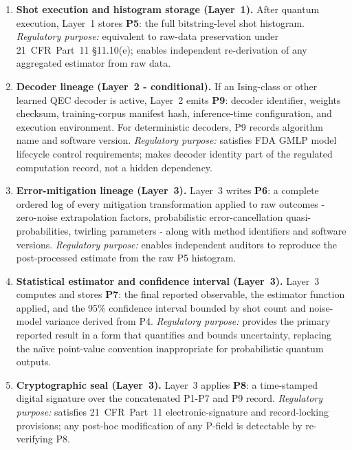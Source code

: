 \documentclass[11pt,letterpaper]{article}
\begin{document}
\begin{enumerate}[leftmargin=2em,itemsep=4pt]
\item \textbf{Shot execution and histogram storage (Layer~1).}\;
After quantum execution, Layer~1 stores \textbf{P5}: the full bitstring-level shot
histogram.
\textit{Regulatory purpose:} equivalent to raw-data preservation under 21~CFR~Part~11
\S{}11.10(e); enables independent re-derivation of any aggregated estimator from raw data.

\item \textbf{Decoder lineage (Layer~2 - conditional).}\;
If an Ising-class or other learned QEC decoder is active, Layer~2 emits \textbf{P9}: decoder
identifier, weights checksum, training-corpus manifest hash, inference-time configuration,
and execution environment.  For deterministic decoders, P9 records algorithm name and
software version.
\textit{Regulatory purpose:} satisfies FDA GMLP model lifecycle control requirements;
makes decoder identity part of the regulated computation record, not a hidden dependency.

\item \textbf{Error-mitigation lineage (Layer~3).}\;
Layer~3 writes \textbf{P6}: a complete ordered log of every mitigation transformation
applied to raw outcomes - zero-noise extrapolation factors, probabilistic error-cancellation
quasi-probabilities, twirling parameters - along with method identifiers and software
versions.
\textit{Regulatory purpose:} enables independent auditors to reproduce the post-processed
estimate from the raw P5 histogram.

\item \textbf{Statistical estimator and confidence interval (Layer~3).}\;
Layer~3 computes and stores \textbf{P7}: the final reported observable, the estimator
function applied, and the 95\% confidence interval bounded by shot count and noise-model
variance derived from P4.
\textit{Regulatory purpose:} provides the primary reported result in a form that quantifies
and bounds uncertainty, replacing the na\"{\i}ve point-value convention inappropriate for
probabilistic quantum outputs.

\item \textbf{Cryptographic seal (Layer~3).}\;
Layer~3 applies \textbf{P8}: a time-stamped digital signature over the concatenated
P1-P7 and P9 record.
\textit{Regulatory purpose:} satisfies 21~CFR~Part~11 electronic-signature and
record-locking provisions; any post-hoc modification of any P-field is detectable by
re-verifying P8.

\end{enumerate}
\end{document}
